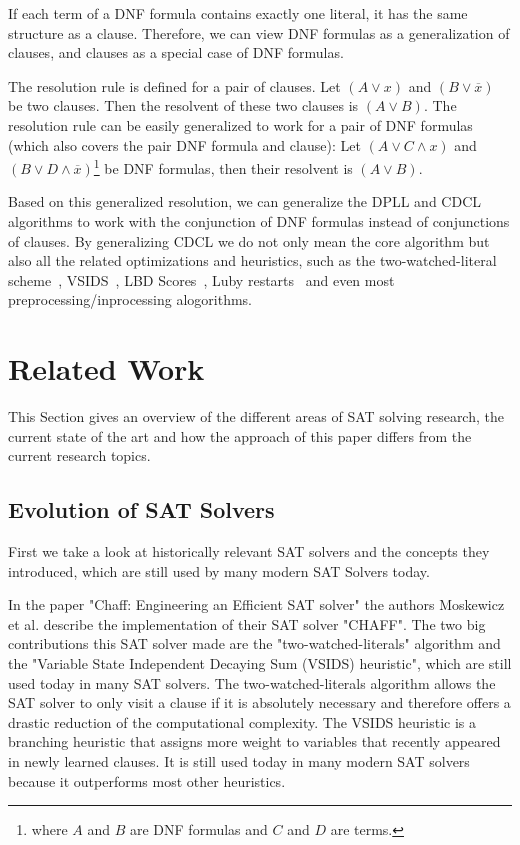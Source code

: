 \documentclass{easychair}
\begin{document}
If each term of a DNF formula contains exactly one literal, it has the same structure as a clause. Therefore, we can view DNF formulas as a generalization of clauses, and clauses as a special case of DNF formulas.

The resolution rule is defined for a pair of clauses. Let $(A \vee x)$ and $(B \vee \overline{x})$ be two clauses. Then the resolvent of these two clauses is $(A \vee B)$. The resolution rule can be easily generalized to work for a pair of DNF formulas (which also covers the pair DNF formula and clause):
Let $(A \vee C \wedge x)$ and $(B \vee D \wedge \overline{x})$\footnote{where $A$ and $B$ are DNF formulas and $C$ and $D$ are terms.} be DNF formulas, then their resolvent is
$(A \vee B)$.

Based on this generalized resolution, we can generalize the DPLL and CDCL algorithms to work with the conjunction of DNF formulas instead of conjunctions of clauses. By generalizing CDCL we do not only mean the core algorithm but also all the related optimizations and heuristics, such as
the two-watched-literal scheme~\cite{moskewicz2001chaff}, VSIDS~\cite{moskewicz2001chaff}, LBD Scores~\cite{audemard2009predicting}, Luby restarts~\cite{luby1993optimal} and even most preprocessing/inprocessing alogorithms. 

\section{Related Work}
\label{ch:Related Work}

This Section gives an overview of the different areas of SAT solving research, the current state of the art and how the approach of this paper differs from the current research topics.

\subsection{Evolution of SAT Solvers}
First we take a look at historically relevant SAT solvers and the concepts they introduced, which are still used by many modern SAT Solvers today.

In the paper "Chaff: Engineering an Efficient SAT solver" \cite{moskewicz2001chaff} the authors Moskewicz et al. describe the implementation of their SAT solver "CHAFF". The two big contributions this SAT solver made are the "two-watched-literals" algorithm and the "Variable State Independent Decaying Sum (VSIDS) heuristic", which are still used today in many SAT solvers. The two-watched-literals algorithm allows the SAT solver to only visit a clause if it is absolutely necessary and therefore offers a drastic reduction of the computational complexity. The VSIDS heuristic is a branching heuristic that assigns more weight to variables that recently appeared in newly learned clauses. It is still used today in many modern SAT solvers because it outperforms most other heuristics.
\end{document}
